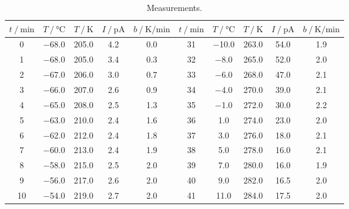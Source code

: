 \begin{table}
    \centering
    \caption{Measurements.}
    \label{tab:measurements_1}
    \begin{tabular}{S S S S S | S S S S S}
      \toprule
      {$t \mathbin{/} \unit{\minute}$} & {$T \mathbin{/} \unit{\celsius}$} & {$T \mathbin{/} \unit{\kelvin}$} &%
      {$I \mathbin{/} \unit{\pico\ampere}$} & {$b \mathbin{/} \unit{\kelvin\per\minute}$} & {$t \mathbin{/} \unit{\minute}$} &%
      {$T \mathbin{/} \unit{\celsius}$} & {$T \mathbin{/} \unit{\kelvin}$} & {$I \mathbin{/} \unit{\pico\ampere}$} &%
      {$b \mathbin{/} \unit{\kelvin\per\minute}$}\\
      \midrule
        \num{ 0} &  \num{-68.0} &  \num{205.0} &  \num{ 4.2} &  \num{0.0} & \num{31} &  \num{-10.0} &  \num{263.0} &  \num{54.0} &  \num{1.9} \\
        \num{ 1} &  \num{-68.0} &  \num{205.0} &  \num{ 3.4} &  \num{0.3} & \num{32} &  \num{ -8.0} &  \num{265.0} &  \num{52.0} &  \num{2.0} \\
        \num{ 2} &  \num{-67.0} &  \num{206.0} &  \num{ 3.0} &  \num{0.7} & \num{33} &  \num{ -6.0} &  \num{268.0} &  \num{47.0} &  \num{2.1} \\
        \num{ 3} &  \num{-66.0} &  \num{207.0} &  \num{ 2.6} &  \num{0.9} & \num{34} &  \num{ -4.0} &  \num{270.0} &  \num{39.0} &  \num{2.1} \\
        \num{ 4} &  \num{-65.0} &  \num{208.0} &  \num{ 2.5} &  \num{1.3} & \num{35} &  \num{ -1.0} &  \num{272.0} &  \num{30.0} &  \num{2.2} \\
        \num{ 5} &  \num{-63.0} &  \num{210.0} &  \num{ 2.4} &  \num{1.6} & \num{36} &  \num{  1.0} &  \num{274.0} &  \num{23.0} &  \num{2.0} \\
        \num{ 6} &  \num{-62.0} &  \num{212.0} &  \num{ 2.4} &  \num{1.8} & \num{37} &  \num{  3.0} &  \num{276.0} &  \num{18.0} &  \num{2.1} \\
        \num{ 7} &  \num{-60.0} &  \num{213.0} &  \num{ 2.4} &  \num{1.9} & \num{38} &  \num{  5.0} &  \num{278.0} &  \num{16.0} &  \num{2.1} \\
        \num{ 8} &  \num{-58.0} &  \num{215.0} &  \num{ 2.5} &  \num{2.0} & \num{39} &  \num{  7.0} &  \num{280.0} &  \num{16.0} &  \num{1.9} \\
        \num{ 9} &  \num{-56.0} &  \num{217.0} &  \num{ 2.6} &  \num{2.0} & \num{40} &  \num{  9.0} &  \num{282.0} &  \num{16.5} &  \num{2.0} \\
        \num{10} &  \num{-54.0} &  \num{219.0} &  \num{ 2.7} &  \num{2.0} & \num{41} &  \num{ 11.0} &  \num{284.0} &  \num{17.5} &  \num{2.0} \\

\end{tabular}
\end{table}
